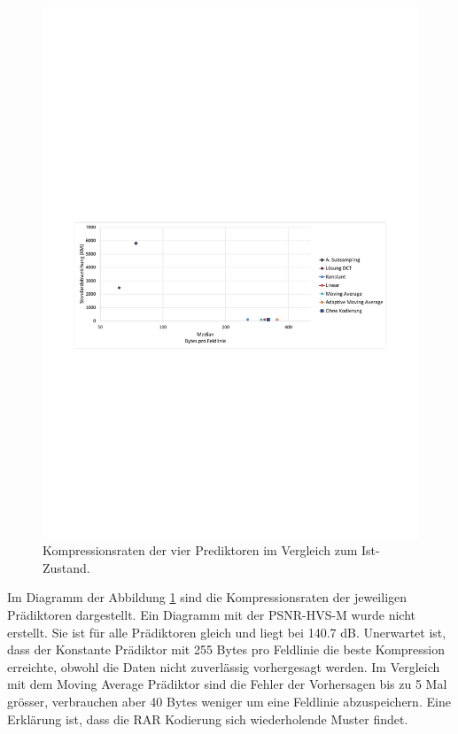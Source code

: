 \begin{figure}[!htbp]
	\center
	\includegraphics[trim = 1.8cm 11cm 1.8cm 12.5cm, clip=true,width=1\textwidth,keepaspectratio]{./pictures/resultate/loesung2/variante0/resultate.pdf}
	\caption{Kompressionsraten der vier Prediktoren im Vergleich zum Ist-Zustand.}
	\label{resultate:loesung2:simple:resultate}
\end{figure}
Im Diagramm der Abbildung \ref{resultate:loesung2:simple:resultate} sind die Kompressionsraten der jeweiligen Prädiktoren dargestellt. Ein Diagramm mit der PSNR-HVS-M wurde nicht erstellt. Sie ist für alle Prädiktoren gleich und liegt bei 140.7 dB. Unerwartet ist, dass der Konstante Prädiktor mit 255 Bytes pro Feldlinie die beste Kompression erreichte, obwohl die Daten nicht zuverlässig vorhergesagt werden. Im Vergleich mit dem Moving Average Prädiktor sind die Fehler der Vorhersagen 
bis zu 5 Mal grösser, verbrauchen aber 40 Bytes weniger um eine Feldlinie abzuspeichern. Eine Erklärung ist, dass die RAR Kodierung sich wiederholende Muster findet.

